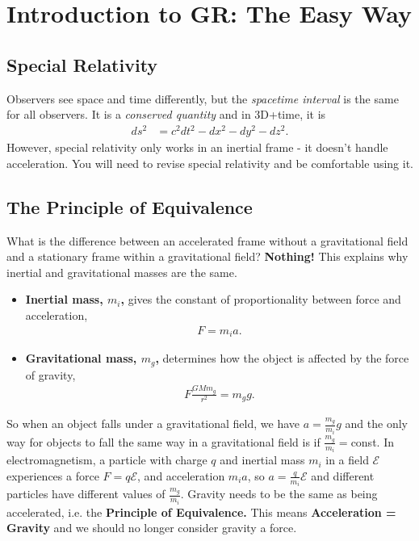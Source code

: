\documentclass[a4paper, 11pt, normalem]{report}
\begin{document}
\chapter{Introduction to GR: The Easy Way}
\section{Special Relativity}
Observers see space and time differently, but the \emph{spacetime interval} is the same for all observers. 
It is a \emph{conserved quantity} and in 3D+time, it is
\begin{align}
    ds^2 &= c^2dt^2 - dx^2 - dy^2 - dz^2.
\end{align}
However, special relativity only works in an inertial frame - it doesn't handle acceleration. 
You will need to revise special relativity and be comfortable using it. 

\section{The Principle of Equivalence}
What is the difference between an accelerated frame without a gravitational field and a stationary frame within a gravitational field? \textbf{Nothing!}
This explains why inertial and gravitational masses are the same. 
\begin{itemize}
    \item \textbf{Inertial mass, $m_i$,} gives the constant of proportionality between force and acceleration, 
        \begin{align}
            F=m_ia.
        \end{align}
    \item \textbf{Gravitational mass, $m_g$,} determines how the object is affected by the force of gravity, 
        \begin{align}
            F \frac{GMm_g}{r^2} = m_gg.
        \end{align}
\end{itemize}
So when an object falls under a gravitational field, we have $a = \frac{m_g}{m_i}g$ and the only way for objects to fall the same way in a gravitational field is if $\frac{m_g}{m_i}=$const.
In electromagnetism, a particle with charge $q$ and inertial mass $m_i$ in a field $\mathcal{E}$ experiences a force $F=q\mathcal{E}$, and acceleration $m_ia$, so $a=\frac{q}{m_i}\mathcal{E}$ and different particles have different values of $\frac{m_g}{m_i}$.
Gravity needs to be the same as being accelerated, i.e. the \textbf{Principle of Equivalence.}
This means \textbf{Acceleration = Gravity} and we should no longer consider gravity a force.
\end{document}
